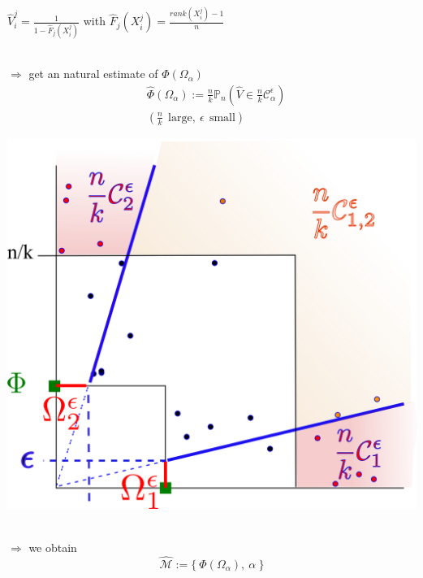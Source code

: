 \documentclass[10pt]{beamer}
\begin{document}
\begin{frame}

$\hat V_i^j = \frac{1}{1- \hat F_j(X_{i}^j)}$ with 
$\hat F_j(X_{i}^j) =\frac{rank(X_i^j) -1}{n} $\\~\\

\begin{minipage}{0.5\linewidth}
\centering
$\Rightarrow$ get an natural estimate of $\Phi(\Omega_\alpha)$
\begin{align*}
&\widehat{\Phi}(\Omega_\alpha) := \frac{n}{k}\mathbb{P}_n( \hat V \in \frac{n}{k}\mathcal{C}_\alpha^\epsilon)\\
&(\frac{n}{k}~~ \text{large}, ~\epsilon~~ \text{small})
\end{align*}
\end{minipage}\hfill
\begin{minipage}{0.5\linewidth}
\centering
\includegraphics[scale=0.35]{sourcefigs/representation2D_nk.png}
\end{minipage}
~\\
$\Rightarrow$ we obtain
$$\widehat{\mathcal{M}}:=\big\{~\widehat{\Phi}(\Omega_{\alpha}),~ \alpha~\big\}$$
\end{frame}
\end{document}
